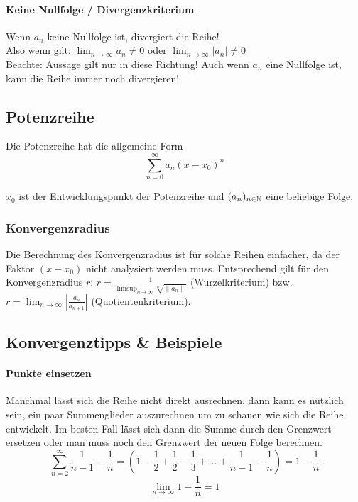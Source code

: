 \paragraph{Keine Nullfolge / Divergenzkriterium}
Wenn $a_n$ keine Nullfolge ist, divergiert die Reihe! \\
Also wenn gilt: $\lim_{n \to \infty} a_n \neq 0$ oder $\lim_{n \to \infty} |a_n| \neq 0$ \\
Beachte: Aussage gilt nur in diese Richtung! Auch wenn $a_n$ eine Nullfolge ist, kann die Reihe immer noch divergieren!

\subsection{Potenzreihe}
Die Potenzreihe hat die allgemeine Form
\[
\sum_{n=0}^\infty a_n (x - x_0)^n
\]

$x_0$ ist der Entwicklungspunkt der Potenzreihe und $(a_n)_{n \in \mathbb{N}}$ eine
beliebige Folge.

\subsubsection{Konvergenzradius}
Die Berechnung des Konvergenzradius ist für solche Reihen einfacher, da der
Faktor $(x - x_0)$ nicht analysiert werden muss. Entsprechend gilt für den
Konvergenzradius $r$:
$r = \frac{1}{\limsup_{n\to\infty} \sqrt[n]{\|a_n\|}}$ (Wurzelkriterium) bzw.
$r = \lim_{n\to\infty} \left | \frac{a_n}{a_{n+1}} \right |$
(Quotientenkriterium).

\subsection{Konvergenztipps \& Beispiele}
\paragraph{Punkte einsetzen}
Manchmal lässt sich die Reihe nicht direkt ausrechnen, dann kann es nützlich sein, ein paar Summenglieder auszurechnen um zu schauen wie sich die Reihe entwickelt. Im besten Fall lässt sich dann die Summe durch den Grenzwert ersetzen oder man muss noch den Grenzwert der neuen Folge berechnen. 
\[
	\sum_{n=2}^\infty \frac{1}{n-1} - \frac{1}{n} = \left( 1 - \frac{1}{2} + \frac{1}{2} - \frac{1}{3} + \ldots + \frac{1}{n-1} - \frac{1}{n} \right) = 1 - \frac{1}{n}
\]
\[
	\lim_{n \to \infty} 1 - \frac{1}{n} = 1
\]

